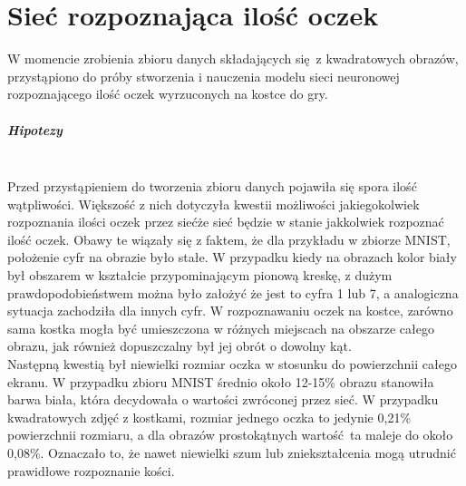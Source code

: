 
\chapter{Sieć rozpoznająca ilość oczek}
W momencie zrobienia zbioru danych składających się z kwadratowych obrazów, przystąpiono
do próby stworzenia i nauczenia modelu sieci neuronowej rozpoznającego ilość oczek
wyrzuconych na kostce do gry.

\paragraph{Hipotezy} \mbox{}\\
Przed przystąpieniem do tworzenia zbioru danych pojawiła się spora ilość wątpliwości.
Większość z nich dotyczyła kwestii możliwości jakiegokolwiek rozpoznania ilości oczek przez siećże sieć będzie w stanie
jakkolwiek rozpoznać ilość oczek. Obawy te wiązały się z faktem, że dla przykładu
w zbiorze MNIST, położenie cyfr na obrazie było stałe. W przypadku kiedy na obrazach
kolor biały był obszarem w kształcie przypominającym pionową kreskę, z dużym
prawdopodobieństwem można było założyć że jest to cyfra 1 lub 7, a analogiczna
sytuacja zachodziła dla innych cyfr. W rozpoznawaniu oczek na kostce, zarówno sama
kostka mogła być umieszczona w różnych miejscach na obszarze całego obrazu, jak również
dopuszczalny był jej obrót o dowolny kąt.\\
Następną kwestią był niewielki rozmiar oczka w stosunku do powierzchnii całego ekranu.
W przypadku zbioru MNIST średnio około 12-15\% obrazu stanowiła barwa biała, która
decydowała o wartości zwróconej przez sieć. W przypadku kwadratowych zdjęć z kostkami,
rozmiar jednego oczka to jedynie 0,21\% powierzchnii rozmiaru, a dla obrazów prostokątnych
wartość ta maleje do około 0,08\%. Oznaczało to, że nawet niewielki szum lub
zniekształcenia mogą utrudnić prawidłowe rozpoznanie kości.

